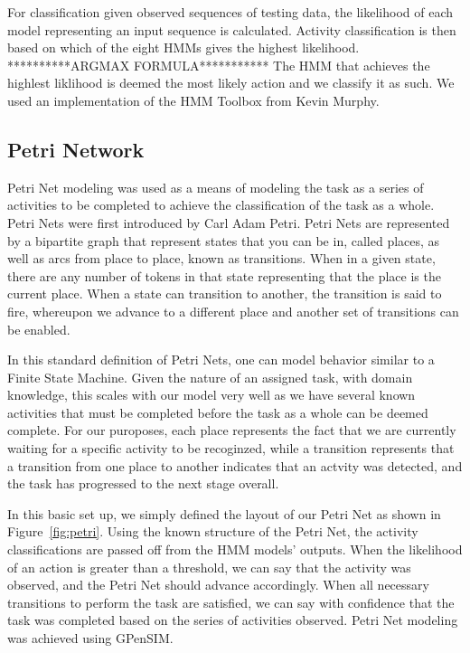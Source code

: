\documentclass[10pt,twocolumn,letterpaper]{article}
\begin{document}
For classification given observed sequences of testing data, the likelihood of each model representing an input sequence is calculated. Activity classification is then based on which of the eight HMMs gives the highest likelihood. **********ARGMAX FORMULA*********** The HMM that achieves the highlest liklihood is deemed the most likely action and we classify it as such. We used an implementation of the HMM Toolbox from Kevin Murphy\cite{murphyHMM}.

\subsection{Petri Network}
Petri Net modeling was used as a means of modeling the task as a series of activities to be completed to achieve the classification of the task as a whole. Petri Nets were first introduced by Carl Adam Petri\cite{petri1962kommunikation}. Petri Nets are represented by a bipartite graph that represent states that you can be in, called places, as well as arcs  from place to place, known as transitions. When in a given state, there are any number of tokens in that state representing that the place is the current place. When a state can transition to another, the transition is said to fire, whereupon we advance to a different place and another set of transitions can be enabled. 

In this standard definition of Petri Nets, one can model behavior similar to a Finite State Machine. Given the nature of an assigned task, with domain knowledge, this scales with our model very well as we have several known activities that must be completed before the task as a whole can be deemed complete. For our puroposes, each place represents the fact that we are currently waiting for a specific activity to be recoginzed, while a transition represents that a transition from one place to another indicates that an actvity was detected, and the task has progressed to the next stage overall.

In this basic set up, we simply defined the layout of our Petri Net as shown in Figure~\ref{fig:petri}. Using the known structure of the Petri Net, the activity classifications are passed off from the HMM models' outputs. When the likelihood of an action is greater than a threshold, we can say that the activity was observed, and the Petri Net should advance accordingly. When all necessary transitions to perform the task are satisfied, we can say with confidence that the task was completed based on the series of activities observed. Petri Net modeling was achieved using GPenSIM\cite{davidrajuh2010gpensim}.
\end{document}
